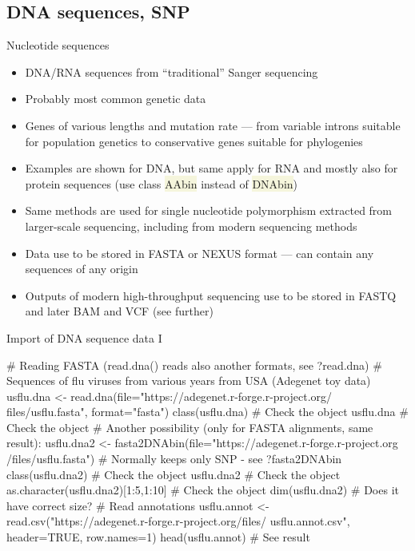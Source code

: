 \documentclass[compress, xelatex, 11pt, xcolor=svgnames, aspectratio=169,
	hyperref={
		bookmarks=true,
		unicode=true,
		colorlinks=true,
		pdftitle={Molecular data in R},
		plainpages=false,
		pdfauthor={Vojtech Zeisek},
		pdfsubject={Course about phylogeny and evolution in R},
		pdfcreator={XeLaTeX},
		pdfkeywords={R, evolution, phylogeny, molecular data},
		linkcolor=Crimson, %
		anchorcolor=Magenta, %
		citecolor=Magenta, %
		filecolor=Magenta, %
		menucolor=Magenta, %
		urlcolor=DodgerBlue, %
		},
	url={hyphens, lowtilde} %
	]{beamer}
\renewcommand{\texttt}[1]{\colorbox{Beige}{{\ttfamily #1}}}
\begin{document}
\subsection{DNA sequences, SNP}

\begin{frame}{Nucleotide sequences}
	\begin{itemize}
		\item DNA/RNA sequences from \enquote{traditional} Sanger sequencing
		\item Probably most common genetic data
		\item Genes of various lengths and mutation rate --- from variable introns suitable for population genetics to conservative genes suitable for phylogenies
		\item Examples are shown for DNA, but same apply for RNA and mostly also for protein sequences (use class \texttt{AAbin} instead of \texttt{DNAbin})
		\item Same methods are used for single nucleotide polymorphism extracted from larger-scale sequencing, including from modern sequencing methods
		\item Data use to be stored in FASTA  or NEXUS format --- can contain any sequences of any origin
		\item Outputs of modern high-throughput sequencing use to be stored in FASTQ and later BAM and VCF (see further)
	\end{itemize}
\end{frame}

\begin{frame}[fragile]{Import of DNA sequence data I}
	\begin{spluscode}
    # Reading FASTA (read.dna() reads also another formats, see ?read.dna)
    # Sequences of flu viruses from various years from USA (Adegenet toy data)
    usflu.dna <- read.dna(file="https://adegenet.r-forge.r-project.org/
      files/usflu.fasta", format="fasta")
    class(usflu.dna) # Check the object
    usflu.dna # Check the object
    # Another possibility (only for FASTA alignments, same result):
    usflu.dna2 <- fasta2DNAbin(file="https://adegenet.r-forge.r-project.org
      /files/usflu.fasta") # Normally keeps only SNP - see ?fasta2DNAbin
    class(usflu.dna2) # Check the object
    usflu.dna2 # Check the object
    as.character(usflu.dna2)[1:5,1:10] # Check the object
    dim(usflu.dna2) # Does it have correct size?
    # Read annotations
    usflu.annot <- read.csv("https://adegenet.r-forge.r-project.org/files/
      usflu.annot.csv", header=TRUE, row.names=1)
    head(usflu.annot) # See result
	\end{spluscode}
\end{frame}
\end{document}
